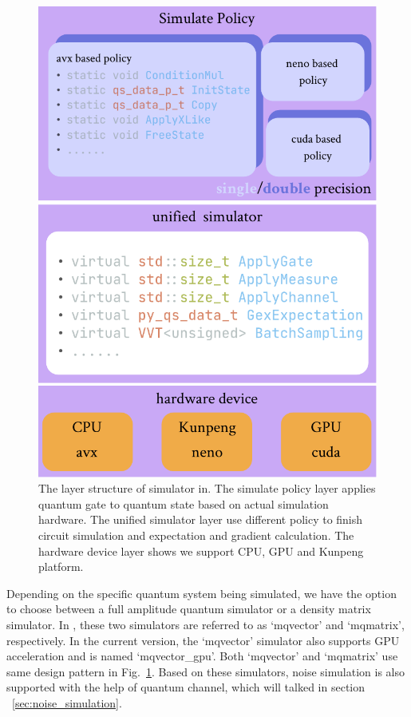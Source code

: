 \begin{figure}[ht]
    \centering
    \includegraphics[scale=0.6]{./images/4_1_simulator_structure.pdf}
    \captionsetup{justification=raggedright,singlelinecheck=false}
    \caption{\label{4_1_sim_str} The layer structure of simulator in. The simulate policy layer applies quantum gate to quantum state based on actual simulation hardware. The unified simulator layer use different policy to finish circuit simulation and expectation and gradient calculation. The hardware device layer shows we support CPU, GPU and Kunpeng platform.}
\end{figure}

Depending on the specific quantum system being simulated, we have the option to choose between a full amplitude quantum simulator or a density matrix simulator. In \MindQuantum, these two simulators are referred to as `mqvector' and `mqmatrix', respectively. In the current \version version, the `mqvector' simulator also supports GPU acceleration and is named `mqvector\_gpu'. Both `mqvector' and `mqmatrix' use same design pattern in Fig.~\ref{4_1_sim_str}. Based on these simulators, noise simulation is also supported with the help of quantum channel, which will talked in section ~\ref{sec:noise_simulation}.

